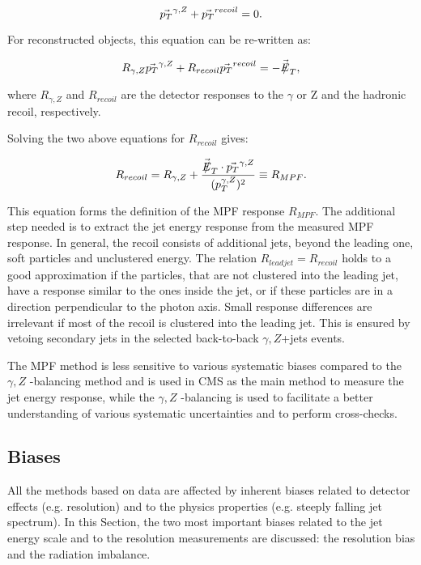 \begin{equation}
\vec{p_{{T}}}^{\gamma,Z} + \vec{p_{{T}}}^{recoil} = 0.
\end{equation}

For reconstructed objects, this equation can be re-written as:

\begin{equation}
R_{\gamma,Z}\vec{\pt}^{\gamma,Z} + R_{recoil}\vec{\pt}^{recoil} = -\vecmet,
\end{equation}

where $R_{\gamma,Z}$ and $R_{recoil}$ are the detector responses to the $\gamma$ or Z and the hadronic recoil, respectively. 

Solving the two above equations for $R_{recoil}$ gives:

\begin{equation}
R_{recoil}= R_{\gamma,Z} +\frac{\vecmet \cdot \vec{\pt}^{\gamma,Z}}{(\pt^{\gamma,Z})^2}\equiv R_{MPF}.
\end{equation}

This equation forms the definition of the MPF response $R_{MPF}$. The additional step needed is to extract the jet energy response from the measured MPF response. In general, the recoil consists of additional jets, beyond the leading one, soft particles and unclustered energy. The relation $R_{leadjet}=R_{recoil}$ holds to a good approximation if the particles, that are not clustered into the leading jet, have a response similar to the ones inside the jet, or if these particles are in a direction perpendicular to the photon axis. Small response differences are irrelevant if most of the recoil is clustered into the leading jet. This is ensured by vetoing secondary jets in the selected back-to-back $\gamma,Z$+jets events.

The MPF method is less sensitive to various systematic biases compared to the $\gamma,Z$ \pt-balancing method and is used in CMS as the main method to measure the jet energy response, while the $\gamma,Z$ \pt-balancing is used to facilitate a better understanding of various systematic uncertainties and to perform cross-checks.

\subsection{Biases}

All the methods based on data are affected by inherent biases related to detector effects (e.g. \pt resolution) and to the physics properties (e.g. steeply falling jet \pt spectrum). In this Section, the two most important biases related to the jet energy scale and to the \pt resolution measurements are discussed: the resolution bias and the radiation imbalance.

